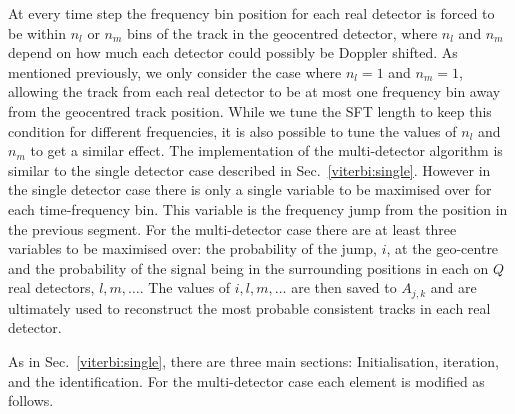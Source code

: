 %
%
At every time step the frequency bin position for each real detector is forced to be within $n_l$ or $n_m$ bins of the track in the geocentred detector, where $n_l$ and $n_m$ depend on how much each detector could possibly be Doppler shifted. As mentioned previously, we only consider the case where $n_l=1$ and $n_m = 1$,  allowing the track from each real detector to be at most one frequency bin away from the geocentred track position. While we tune the \ac{SFT} length to keep this condition for different frequencies, it is also possible to tune the values of $n_l$ and $n_m$ to get a similar effect.
%
%
The implementation of the multi-detector algorithm is similar to the single detector case described in Sec.~\ref{viterbi:single}.  However in the single detector case there is only a single variable to be maximised over for each time-frequency bin. This variable is the frequency jump from the position in the previous segment. For the multi-detector case there are at least three variables to be maximised over: the probability of the jump, $i$, at the geo-centre and the probability of the signal being in the surrounding positions in each on $Q$ real detectors, $l,m,\dots$. The values of $i,l,m, \dots$ are then saved to $A_{j,k}$ and are ultimately used to reconstruct the most probable consistent tracks in each real detector.

%
%
As in Sec.~\ref{viterbi:single}, there are three main sections: Initialisation, iteration, and the identification. For the multi-detector case each element is modified as follows.

